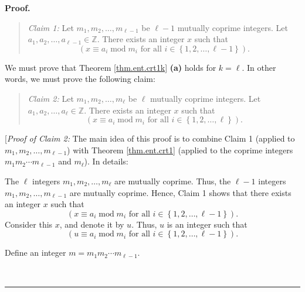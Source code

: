 \documentclass[numbers=enddot,12pt,final,onecolumn,notitlepage]{scrartcl}%
\numberwithin{exer}{subsection}
\theoremstyle{definition}
\newenvironment{statement}{\begin{quote}}{\end{quote}}
\newenvironment{proof}[1][Proof]{\noindent\textbf{#1.} }{\ \rule{0.5em}{0.5em}}
\begin{document}
\begin{proof}
\begin{statement}
\textit{Claim 1:} Let $m_{1},m_{2},\ldots,m_{\ell-1}$ be $\ell-1$ mutually
coprime integers. Let $a_{1},a_{2},\ldots,a_{\ell-1}\in\mathbb{Z}$. There
exists an integer $x$ such that
\begin{equation}
\left(  x\equiv a_{i}\operatorname{mod}m_{i}\text{ for all }i\in\left\{
1,2,\ldots,\ell-1\right\}  \right)  . \label{pf.thm.ent.crt1k.a.c1.claim}%
\end{equation}

\end{statement}

We must prove that Theorem \ref{thm.ent.crt1k} \textbf{(a)} holds for $k=\ell
$. In other words, we must prove the following claim:

\begin{statement}
\textit{Claim 2:} Let $m_{1},m_{2},\ldots,m_{\ell}$ be $\ell$ mutually coprime
integers. Let $a_{1},a_{2},\ldots,a_{\ell}\in\mathbb{Z}$. There exists an
integer $x$ such that
\begin{equation}
\left(  x\equiv a_{i}\operatorname{mod}m_{i}\text{ for all }i\in\left\{
1,2,\ldots,\ell\right\}  \right)  . \label{pf.thm.ent.crt1k.a.c2.claim}%
\end{equation}

\end{statement}

[\textit{Proof of Claim 2:} The main idea of this proof is to combine Claim 1
(applied to $m_{1},m_{2},\ldots,m_{\ell-1}$) with Theorem \ref{thm.ent.crt1}
(applied to the coprime integers $m_{1}m_{2}\cdots m_{\ell-1}$ and $m_{\ell}%
$). In details:

The $\ell$ integers $m_{1},m_{2},\ldots,m_{\ell}$ are mutually coprime. Thus,
the $\ell-1$ integers $m_{1},m_{2},\ldots,m_{\ell-1}$ are mutually coprime.
Hence, Claim 1 shows that there exists an integer $x$ such that
\[
\left(  x\equiv a_{i}\operatorname{mod}m_{i}\text{ for all }i\in\left\{
1,2,\ldots,\ell-1\right\}  \right)  .
\]
Consider this $x$, and denote it by $u$. Thus, $u$ is an integer such that%
\begin{equation}
\left(  u\equiv a_{i}\operatorname{mod}m_{i}\text{ for all }i\in\left\{
1,2,\ldots,\ell-1\right\}  \right)  . \label{pf.thm.ent.crt1k.a.c2.pf.u}%
\end{equation}


Define an integer $m=m_{1}m_{2}\cdots m_{\ell-1}$.


\end{proof}
\end{document}
